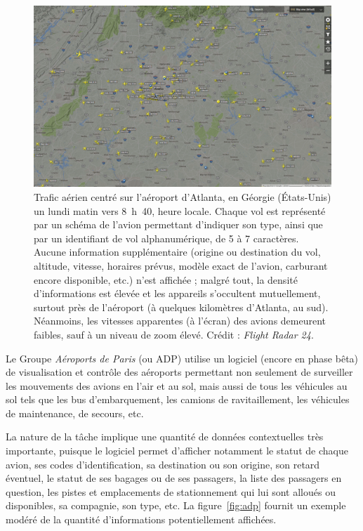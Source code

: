 	\begin{figure}[H]
		\centering
		\includegraphics[width=\textwidth]{figures/ch1/atlanta}
		\caption[Trafic aérien, Atlanta.]{Trafic aérien centré sur l'aéroport d'Atlanta, en Géorgie (États-Unis) un lundi matin vers 8~h~40, heure locale. Chaque vol est représenté par un schéma de l'avion permettant d'indiquer son type, ainsi que par un identifiant de vol alphanumérique, de 5 à 7 caractères. Aucune information supplémentaire (origine ou destination du vol, altitude, vitesse, horaires prévus, modèle exact de l'avion, carburant encore disponible, etc.) n'est affichée ; malgré tout, la densité d'informations est élevée et les appareils s'occultent mutuellement, surtout près de l'aéroport (à quelques kilomètres d'Atlanta, au sud). Néanmoins, les vitesses apparentes (à l'écran) des avions demeurent faibles, sauf à un niveau de zoom élevé. Crédit : \emph{Flight Radar 24\footnotemark}.}
		\label{fig:atlanta}
	\end{figure}
	
	
	Le Groupe \emph{Aéroports de Paris} (ou ADP) utilise un logiciel (encore en phase bêta) de visualisation et contrôle des aéroports\footnotemark{} permettant non seulement de surveiller les mouvements des avions en l'air et au sol, mais aussi de tous les véhicules au sol tels que les bus d'embarquement, les camions de ravitaillement, les véhicules de maintenance, de secours, etc.
	
	
	La nature de la tâche implique une quantité de données contextuelles très importante, puisque le logiciel permet d'afficher notamment le statut de chaque avion, ses codes d'identification, sa destination ou son origine, son retard éventuel, le statut de ses bagages ou de ses passagers, la liste des passagers en question, les pistes et emplacements de stationnement qui lui sont alloués ou disponibles, sa compagnie, son type, etc. La figure~\ref{fig:adp} fournit un exemple modéré de la quantité d'informations potentiellement affichées.
	
